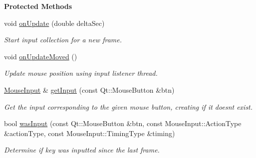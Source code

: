 \begin{Indent}\textbf{ Protected Methods}\par
\begin{DoxyCompactItemize}
\item 
\mbox{\label{classrev_1_1_mouse_handler_a01b44d15055a192944f8f5ca7e81c837}} 
void \mbox{\hyperlink{classrev_1_1_mouse_handler_a01b44d15055a192944f8f5ca7e81c837}{on\+Update}} (double delta\+Sec)
\begin{DoxyCompactList}\small\item\em Start input collection for a new frame. \end{DoxyCompactList}\item 
\mbox{\label{classrev_1_1_mouse_handler_a172b8c0c4af1b578cfc64592596fde19}} 
void \mbox{\hyperlink{classrev_1_1_mouse_handler_a172b8c0c4af1b578cfc64592596fde19}{on\+Update\+Moved}} ()
\begin{DoxyCompactList}\small\item\em Update mouse position using input listener thread. \end{DoxyCompactList}\item 
\mbox{\label{classrev_1_1_mouse_handler_a7c595abe36b9bf2d023d482c7861f000}} 
\mbox{\hyperlink{structrev_1_1_mouse_input}{Mouse\+Input}} \& \mbox{\hyperlink{classrev_1_1_mouse_handler_a7c595abe36b9bf2d023d482c7861f000}{get\+Input}} (const Qt\+::\+Mouse\+Button \&btn)
\begin{DoxyCompactList}\small\item\em Get the input corresponding to the given mouse button, creating if it doesn\textquotesingle{}t exist. \end{DoxyCompactList}\item 
\mbox{\label{classrev_1_1_mouse_handler_af13906a94ede53c5b0b033e6cf996117}} 
bool \mbox{\hyperlink{classrev_1_1_mouse_handler_af13906a94ede53c5b0b033e6cf996117}{was\+Input}} (const Qt\+::\+Mouse\+Button \&btn, const Mouse\+Input\+::\+Action\+Type \&action\+Type, const Mouse\+Input\+::\+Timing\+Type \&timing)
\begin{DoxyCompactList}\small\item\em Determine if key was inputted since the last frame. \end{DoxyCompactList}\item 

\end{DoxyCompactItemize}
\end{Indent}
